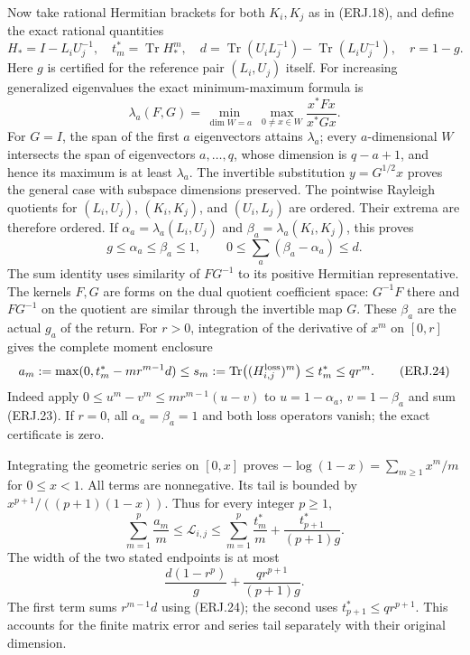 \documentclass[11pt]{article}
\newcommand{\Tr}{\operatorname{Tr}}\newcommand{\diag}{\operatorname{diag}}
\begin{document}
Now take rational Hermitian brackets for both $K_i,K_j$ as in
(ERJ.18), and define the exact rational quantities
\[
 H_*=I-L_iU_j^{-1},\quad t_m^*=\Tr H_*^m,\quad
 d=\Tr(U_iL_j^{-1})-\Tr(L_iU_j^{-1}),\quad r=1-g.
 \tag{ERJ.21}
\]
Here $g$ is certified for the reference pair $(L_i,U_j)$ itself.
For increasing generalized eigenvalues the exact minimum-maximum
formula is
\[
 \lambda_a(F,G)=\min_{\dim W=a}\ \max_{0\ne x\in W}
                 \frac{x^*Fx}{x^*Gx}.\tag{ERJ.22}
\]
For $G=I$, the span of the first $a$ eigenvectors attains
$\lambda_a$; every $a$-dimensional $W$ intersects the span of
eigenvectors $a,\ldots,q$, whose dimension is $q-a+1$, and hence
its maximum is at least $\lambda_a$. The invertible substitution
$y=G^{1/2}x$ proves the general case with subspace dimensions preserved.
The pointwise Rayleigh quotients for $(L_i,U_j)$, $(K_i,K_j)$,
and $(U_i,L_j)$ are ordered. Their extrema are therefore ordered.
If $\alpha_a=\lambda_a(L_i,U_j)$ and
$\beta_a=\lambda_a(K_i,K_j)$, this proves
\[
 g\le\alpha_a\le\beta_a\le1,
 \qquad0\le\sum_a(\beta_a-\alpha_a)\le d.\tag{ERJ.23}
\]
The sum identity uses similarity of $FG^{-1}$ to its positive
Hermitian representative. The kernels $F,G$ are forms on the dual
quotient coefficient space: $G^{-1}F$ there and $FG^{-1}$ on the
quotient are similar through the invertible map $G$.
These $\beta_a$ are the actual $g_a$
of the return. For $r>0$, integration of the derivative of $x^m$
on $[0,r]$ gives the complete moment enclosure
\[
 a_m:=\max(0,t_m^*-mr^{m-1}d)
 \le s_m:=\Tr\bigl((H_{i,j}^{\rm loss})^m\bigr)
 \le t_m^*\le qr^m.\tag{ERJ.24}
\]
Indeed apply $0\le u^m-v^m\le mr^{m-1}(u-v)$ to
$u=1-\alpha_a$, $v=1-\beta_a$ and sum (ERJ.23).
If $r=0$, all $\alpha_a=\beta_a=1$ and both loss operators vanish;
the exact certificate is zero.

Integrating the geometric series on $[0,x]$ proves
$-\log(1-x)=\sum_{m\ge1}x^m/m$ for $0\le x<1$.
All terms are nonnegative. Its tail is bounded by
$x^{p+1}/((p+1)(1-x))$. Thus for every integer $p\ge1$,
\[
 \boxed{\sum_{m=1}^p\frac{a_m}{m}\le\mathcal L_{i,j}\le
 \sum_{m=1}^p\frac{t_m^*}{m}+
                   \frac{t_{p+1}^*}{(p+1)g}.}\tag{ERJ.25}
\]
The width of the two stated endpoints is at most
\[
 \frac{d(1-r^p)}{g}+\frac{qr^{p+1}}{(p+1)g}.\tag{ERJ.26}
\]
The first term sums $r^{m-1}d$ using (ERJ.24); the second uses
$t_{p+1}^*\le qr^{p+1}$. This accounts for the finite matrix
error and series tail separately with their original dimension.
\end{document}
